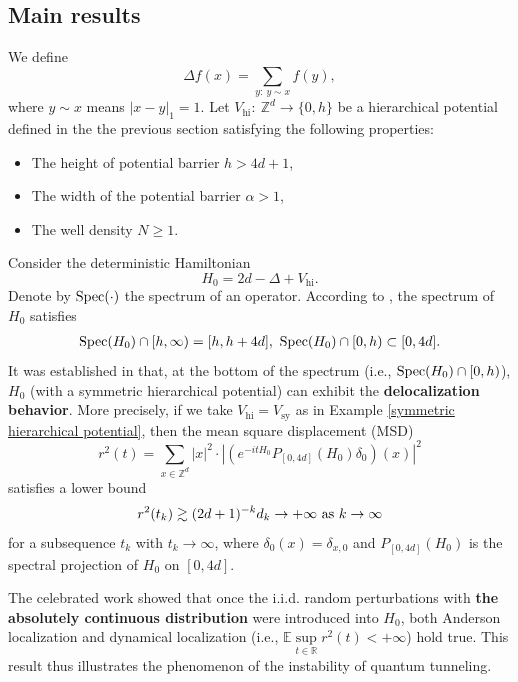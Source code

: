 \documentclass[11pt,reqno,UTF8,twoside]{amsart}
\newcommand{\Z}{\mathbb{Z}}
\newcommand{\R}{\mathbb{R}}
\newcommand{\E}{\mathbb{E}}
\newcommand{\spec}{{\rm Spec}}
\theoremstyle{definition}
\numberwithin{equation}{section}
\begin{document}
\subsection{Main results}
We define
\begin{equation}\label{discrete Laplacian}
  \Delta f(x)=\sum_{y:\ y\sim x} f(y), 
\end{equation}
where  $y\sim x$ means $|x-y|_1=1$.  Let $V_{\text{hi}}:\ \Z^d\to\{0,h\}$ be a hierarchical potential  defined in  the the previous section  satisfying  the following properties:
\begin{itemize}
	\item The height of potential barrier $h>4d+1$, 
	\item The width of the potential barrier $\alpha>1$, 
	\item The well density $N\geq 1$.
\end{itemize}
Consider the deterministic Hamiltonian
\[H_0=2d-\Delta +V_{\text{hi}}.\]
Denote by $\spec(\cdot)$ the spectrum of an operator.  According to \cite[Proposition 3.1]{JLMS85}, the spectrum of $H_0$ satisfies 
\begin{align*}
\spec(H_0) \cap [h,\infty) =[h,h+4d],\ \spec(H_0) \cap [0,h) \subset [0,4d].
\end{align*}
It was established  in  \cite[Theorem 4.2]{JLMS85} that, at the bottom of the spectrum (i.e., $\spec(H_0) \cap [0,h)$), $H_0$  (with a symmetric hierarchical potential)  can  exhibit  the {\bf delocalization behavior}. More precisely,  if we take $V_{\text{hi}} = V_{\text{sy}}$ as in Example \ref{symmetric hierarchical potential}, then the mean square displacement (MSD) 
\[r^2(t)= \sum_{x\in \Z^d} |x|^2 \cdot \left| (e^{-itH_0}P_{[0,4d]}(H_0) \delta_0) (x) \right|^2\]
satisfies  a lower bound
  \begin{align}\label{MSD111}
  r^2(t_k) \gtrsim (2d+1)^{-k} d_k\to  +\infty \ {\rm as} \ k\to\infty
 \end{align}
for a subsequence ${t_k}$ with $t_k \to \infty$,  where $\delta_0(x)=\delta_{x,0}$ and $P_{[0,4d]}(H_0)$ is the spectral projection of $H_0$ on $[0,4d]$.  


The celebrated work \cite{JLMS85} showed  that once the i.i.d.  random perturbations with {\bf the absolutely continuous distribution} were introduced into $H_0$, both Anderson localization and dynamical localization (i.e., $\E \sup\limits_{t\in\R} r^2(t)<+\infty$) hold true. This result thus illustrates the phenomenon of the instability of quantum tunneling.   
\end{document}
